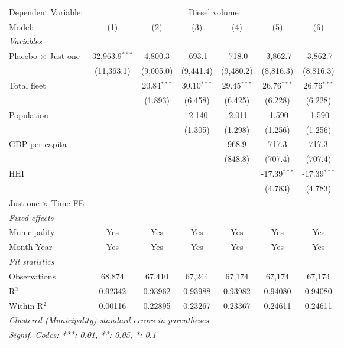 \documentclass[
]{article}
\begin{document}
\begin{tabular}{lcccccc}
\tabularnewline\midrule\midrule
Dependent Variable:&\multicolumn{6}{c}{Diesel volume}\\
Model:&(1) & (2) & (3) & (4) & (5) & (6)\\
\midrule \emph{Variables}&   &   &   &   &   &  \\
Placebo $\times $ Just one & 32,963.9$^{***}$ & 4,800.3 & -693.1 & -718.0 & -3,862.7 & -3,862.7\\
  &(11,363.1) & (9,005.0) & (9,441.4) & (9,480.2) & (8,816.3) & (8,816.3)\\
Total fleet &    & 20.84$^{***}$ & 30.10$^{***}$ & 29.45$^{***}$ & 26.76$^{***}$ & 26.76$^{***}$\\
  &   & (1.893) & (6.458) & (6.425) & (6.228) & (6.228)\\
Population &    &    & -2.140 & -2.011 & -1.590 & -1.590\\
  &   &    & (1.305) & (1.298) & (1.256) & (1.256)\\
GDP per capita &    &    &    & 968.9 & 717.3 & 717.3\\
  &   &    &    & (848.8) & (707.4) & (707.4)\\
HHI &    &    &    &    & -17.39$^{***}$ & -17.39$^{***}$\\
  &   &    &    &    & (4.783) & (4.783)\\
Just one $\times$ Time FE &  &  &  &  &  & \\
\midrule \emph{Fixed-effects}&   &   &   &   &   &  \\
Municipality & Yes & Yes & Yes & Yes & Yes & Yes\\
Month-Year & Yes & Yes & Yes & Yes & Yes & Yes\\
\midrule \emph{Fit statistics}&  & & & & & \\
Observations & 68,874&67,410&67,244&67,174&67,174&67,174\\
R$^2$ & 0.92342&0.93962&0.93988&0.93982&0.94080&0.94080\\
Within R$^2$ & 0.00116&0.22895&0.23267&0.23367&0.24611&0.24611\\
\midrule\midrule\multicolumn{7}{l}{\emph{Clustered (Municipality) standard-errors in parentheses}}\\
\multicolumn{7}{l}{\emph{Signif. Codes: ***: 0.01, **: 0.05, *: 0.1}}\\
\end{tabular}
\end{document}
